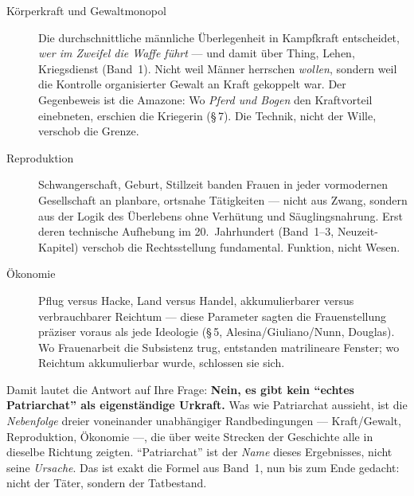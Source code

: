 \documentclass[11pt,a4paper,ngerman]{scrartcl}
\newcommand{\chipbase}[2]{\hspace{0pt}{\footnotesize\textcolor{#1}{[\textsc{#2}]}}}
\newcommand{\chipplausibel}[1]{\chipbase{chipamber}{#1}}
\begin{document}
\begin{description}
\item[Körperkraft und Gewaltmonopol] Die durchschnittliche männliche Überlegenheit in Kampfkraft entscheidet, \emph{wer im Zweifel die Waffe führt} --- und damit über Thing, Lehen, Kriegsdienst (Band~1). Nicht weil Männer herrschen \emph{wollen}, sondern weil die Kontrolle organisierter Gewalt an Kraft gekoppelt war. Der Gegenbeweis ist die Amazone: Wo \emph{Pferd und Bogen} den Kraftvorteil einebneten, erschien die Kriegerin (§\,7). Die Technik, nicht der Wille, verschob die Grenze.
\item[Reproduktion] Schwangerschaft, Geburt, Stillzeit banden Frauen in jeder vormodernen Gesellschaft an planbare, ortsnahe Tätigkeiten --- nicht aus Zwang, sondern aus der Logik des Überlebens ohne Verhütung und Säuglingsnahrung. Erst deren technische Aufhebung im 20.~Jahrhundert (Band~1--3, Neuzeit-Kapitel) verschob die Rechtsstellung fundamental. Funktion, nicht Wesen.
\item[Ökonomie] Pflug versus Hacke, Land versus Handel, akkumulierbarer versus verbrauchbarer Reichtum --- diese Parameter sagten die Frauenstellung präziser voraus als jede Ideologie (§\,5, Alesina/Giuliano/Nunn, Douglas). Wo Frauenarbeit die Subsistenz trug, entstanden matrilineare Fenster; wo Reichtum akkumulierbar wurde, schlossen sie sich.
\end{description}

Damit lautet die Antwort auf Ihre Frage: \textbf{Nein, es gibt kein \enquote{echtes Patriarchat} als eigenständige Urkraft.} Was wie Patriarchat aussieht, ist die \emph{Nebenfolge} dreier voneinander unabhängiger Randbedingungen --- Kraft/Gewalt, Reproduktion, Ökonomie ---, die über weite Strecken der Geschichte alle in dieselbe Richtung zeigten. \enquote{Patriarchat} ist der \emph{Name} dieses Ergebnisses, nicht seine \emph{Ursache}. Das ist exakt die Formel aus Band~1, nun bis zum Ende gedacht: nicht der Täter, sondern der Tatbestand. \chipplausibel{plausibel}
\end{document}

